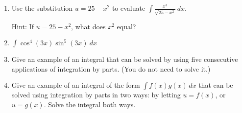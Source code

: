 \documentclass[12pt]{article}
\begin{document}
\begin{enumerate}
\begin{enumerate}
\item Use the substitution $u=25-x^2$ to evaluate $\displaystyle\int \frac{x^3}{\sqrt{25-x^2}} \ dx$.

Hint: If $u=25-x^2$, what does $x^2$ equal?

\pagebreak
\item $\displaystyle\int \cos^4(3x)\sin^5(3x) \ dx$
\vfill

\item Give an example of an integral that can be solved by using five consecutive applications of integration by parts.  (You do not need to solve it.)

\vfill

\item Give an example of an integral of the form $\displaystyle \int f(x) g(x) \, dx$ that can be solved using integration by parts in two ways: by letting $u = f(x)$, or $u = g(x)$.  Solve the integral both ways.

\vfill





\end{enumerate} 


\end{enumerate} 
\end{document}
